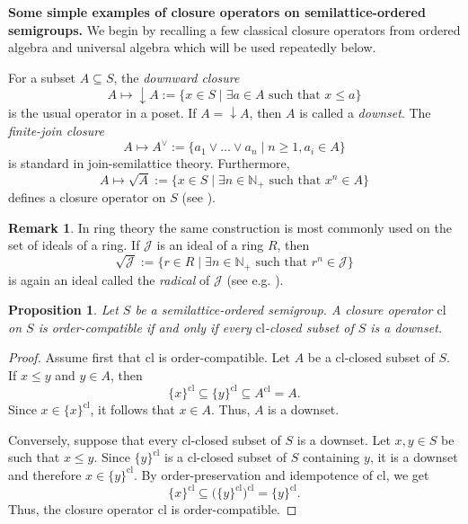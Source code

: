 \documentclass[10pt, reqno]{amsart}
\theoremstyle{plain}
\newtheorem{prop}[theorem]{Proposition}
\theoremstyle{definition}
\newtheorem{remark}[theorem]{Remark}
\begin{document}
\medskip \noindent 
\textbf{Some simple examples of closure operators on semilattice-ordered semigroups.} We begin by recalling a few classical closure operators from ordered algebra and universal algebra which will be used repeatedly below. 

For a subset $A\subseteq S$, the \emph{downward closure} 
\begin{equation*}
    A \mapsto \downarrow A := \{ x\in S \mid \exists a\in A \text{ such that } x \leqslant a\}
\end{equation*}
is the usual operator in a poset. If $A = \downarrow A$, then $A$ is called a \emph{downset}. The \emph{finite-join closure} 
\begin{equation*} 
    A\mapsto A^{\lor} := \{a_1 \lor \ldots \lor a_n \mid n \geqslant 1, a_i \in A\}
\end{equation*}
is standard in join-semilattice theory. Furthermore, 
\begin{equation*}
    A \mapsto \sqrt{A} := \{x \in S \mid \exists n\in\mathbb{N}_+ \text{ such that } x^n \in A\}
\end{equation*}
defines a closure operator on $S$ (see \cite[Section 1]{KollarSulka}). 
\begin{remark}
    In ring theory the same construction is most commonly used on the set of ideals of a ring. If $\mathcal{J}$ is an ideal of a ring $R$, then $$\sqrt{\mathcal{J}} := \{r \in R \mid \exists n\in\mathbb{N}_+ \text{ such that } r^n \in \mathcal{J}\}$$ is again an ideal called the \emph{radical} of $\mathcal{J}$ (see e.g. \cite[Section 1]{matsumura1980commutative}). 
\end{remark}
\begin{prop}\label{order_compatibility_is_equivalent_to_all_closed_subsets_being_down_sets}
    Let $S$ be a semilattice-ordered semigroup. A closure operator $\mathrm{cl}$ on $S$ is order-compatible if and only if every $\mathrm{cl}$-closed subset of $S$ is a downset.
\end{prop}
\begin{proof}
    Assume first that $\mathrm{cl}$ is order-compatible. Let $A$ be a $\mathrm{cl}$-closed subset of $S$. If $x \leqslant y$ and $y \in A$, then $$\{x\}^\mathrm{cl}\subseteq\{y\}^\mathrm{cl}\subseteq A^\mathrm{cl} = A.$$ Since $x\in\{x\}^\mathrm{cl}$, it follows that $x\in A$. Thus, $A$ is a downset. 

    Conversely, suppose that every $\mathrm{cl}$-closed subset of $S$ is a downset. Let $x, y\in S$ be such that $x \leqslant y$. Since $\{y\}^\mathrm{cl}$ is a $\mathrm{cl}$-closed subset of $S$ containing $y$, it is a downset and therefore $x \in \{y\}^\mathrm{cl}$. By order-preservation and idempotence of $\mathrm{cl}$, we get $$\{x\}^\mathrm{cl}\subseteq\big(\{y\}^\mathrm{cl}\big)^\mathrm{cl} = \{y\}^\mathrm{cl}.$$ Thus, the closure operator $\mathrm{cl}$ is order-compatible. 
\end{proof}
\end{document}
